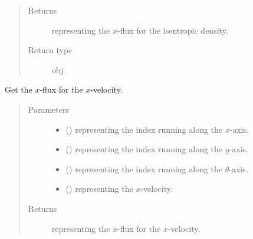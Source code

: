 \documentclass[letterpaper,10pt,english]{sphinxmanual}
\begin{document}
\begin{fulllineitems}
\begin{fulllineitems}
\begin{quote}
\begin{description}
\begin{itemize}
\end{itemize}

\item[{Returns}] \leavevmode
{} representing the \(x\)-flux for the isentropic density.

\item[{Return type}] \leavevmode
obj

\end{description}\end{quote}

\end{fulllineitems}


\begin{fulllineitems}
\label{\detokenize{api:dycore.flux_isentropic_nonconservative_centered.FluxIsentropicNonconservativeCentered._get_centered_flux_x_u}}
Get the \(x\)-flux for the \(x\)-velocity.
\begin{quote}\begin{description}
\item[{Parameters}] \leavevmode\begin{itemize}
\item {} 
 () \textendash{}  representing the index running along the \(x\)-axis.

\item {} 
 () \textendash{}  representing the index running along the \(y\)-axis.

\item {} 
 () \textendash{}  representing the index running along the \(\theta\)-axis.

\item {} 
 () \textendash{}  representing the \(x\)-velocity.

\end{itemize}

\item[{Returns}] \leavevmode
{} representing the \(x\)-flux for the \(x\)-velocity.


\end{description}
\end{quote}
\end{fulllineitems}
\end{fulllineitems}
\end{document}

